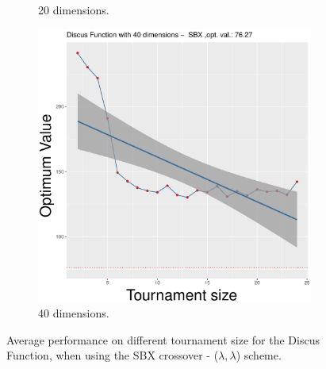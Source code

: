 \begin{figure}[t]
\begin{subfigure}[b]{0.33\textwidth}
		\caption{20 dimensions.}
	\end{subfigure}
	\begin{subfigure}[b]{0.33\textwidth}
		\centering
		\includegraphics[width=\textwidth]{img/SBX-40D/unimodal_sbx_11_dim_40.pdf}
		\caption{40 dimensions.}
	\end{subfigure}
	\caption{Average performance on different tournament size for the Discus Function, when using the SBX crossover - ($\lambda, \lambda$) scheme.}
	\label{sbx-11-a}
\end{figure}


